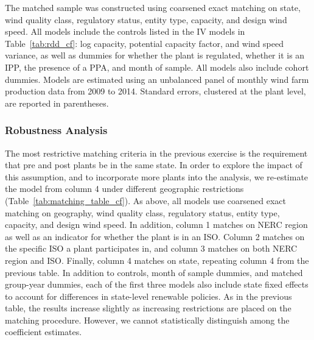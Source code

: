 \documentclass[12pt]{article}
\begin{document}
\begin{table}[h]
\begin{center}
\caption{Matching Estimates \label{tab:matching_group}}

\end{center}
\footnotesize
The matched sample was constructed using coarsened exact matching on state, wind quality class, regulatory status, entity type, capacity, and design wind speed. All models include the controls listed in the IV models in Table~\ref{tab:rdd_cf}: log capacity, potential capacity factor, and wind speed variance, as well as dummies for whether the plant is regulated, whether it is an IPP, the presence of a PPA, and month of sample. All models also include cohort dummies. Models are estimated using an unbalanced panel of monthly wind farm production data from 2009 to 2014. Standard errors, clustered at the plant level, are reported in parentheses.
\end{table}

\subsubsection*{Robustness Analysis}

The most restrictive matching criteria in the previous exercise is the requirement that pre and post plants be in the same state. In order to explore the impact of this assumption, and to incorporate more plants into the analysis, we re-estimate the model from column 4 under different geographic restrictions (Table~\ref{tab:matching_table_cf}). As above, all models use coarsened exact matching on geography, wind quality class, regulatory status, entity type, capacity, and design wind speed. In addition, column 1 matches on NERC region as well as an indicator for whether the plant is in an ISO. Column 2 matches on the specific ISO a plant participates in, and column 3 matches on both NERC region and ISO. Finally, column 4 matches on state, repeating column 4 from the previous table. In addition to controls, month of sample dummies, and matched group-year dummies, each of the first three models also include state fixed effects to account for differences in state-level renewable policies. As in the previous table, the results increase slightly as increasing restrictions are placed on the matching procedure. However, we cannot statistically distinguish among the coefficient estimates.
\end{document}
